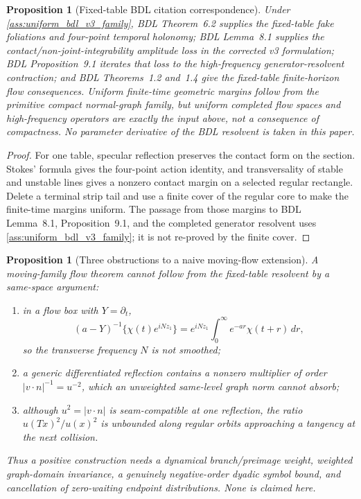 \documentclass[11pt]{amsart}
\theoremstyle{compactplain}
\newtheorem{proposition}[theorem]{Proposition}
\theoremstyle{compactdefinition}
\theoremstyle{compactremark}
\begin{document}
\begin{proposition}[Fixed-table BDL citation correspondence]
\label{prop:fixed_table_bdl_correspondence}
\label{lem:fixed_table_hopf_uni}
\label{lem:central_standard_family_compactness}
\label{lem:uniform_bdl_hypothesis_verification}
\label{prop:uniform_dolgopyat_nonintegrability}
\label{prop:imported_bdl_high_frequency}
Under \cref{ass:uniform_bdl_v3_family}, BDL Theorem~6.2 supplies the
fixed-table fake foliations and four-point temporal holonomy; BDL Lemma~8.1
supplies the contact/non-joint-integrability amplitude loss in the corrected
v3 formulation; BDL Proposition~9.1 iterates that loss to the
high-frequency generator-resolvent contraction; and BDL Theorems~1.2 and~1.4
give the fixed-table finite-horizon flow consequences.  Uniform finite-time
geometric margins follow from the primitive compact normal-graph family, but
uniform completed flow spaces and high-frequency operators are exactly the
input above, not a consequence of compactness.  No parameter derivative of
the BDL resolvent is taken in this paper.
\end{proposition}

\begin{proof}
For one table, specular reflection preserves the contact form on the section.
Stokes' formula gives the four-point action identity, and transversality of
stable and unstable lines gives a nonzero contact margin on a selected regular
rectangle.  Delete a terminal strip tail and use a finite cover of the regular
core to make the finite-time margins uniform.  The passage from those margins
to BDL Lemma~8.1, Proposition~9.1, and the completed generator resolvent uses
\cref{ass:uniform_bdl_v3_family}; it is not re-proved by the finite cover.
\end{proof}

\begin{proposition}[Three obstructions to a naive moving-flow extension]
\label{prop:flow_obstruction_trichotomy}
A moving-family flow theorem cannot follow from the fixed-table resolvent by a
same-space argument:
\begin{enumerate}[label=\textup{(\roman*)},wide,labelindent=0pt]
\item in a flow box with \(Y=\partial_t\),
\[
 (a-Y)^{-1}\{\chi(t)e^{iNz_1}\}
 =e^{iNz_1}\int_0^\infty e^{-ar}\chi(t+r)\,dr,
\]
so the transverse frequency \(N\) is not smoothed;
\item a generic differentiated reflection contains a nonzero multiplier of
order \(|v\cdot n|^{-1}=u^{-2}\), which an unweighted same-level graph norm
cannot absorb;
\item although \(u^2=|v\cdot n|\) is seam-compatible at one reflection, the
ratio \(u(Tx)^2/u(x)^2\) is unbounded along regular orbits approaching a
tangency at the next collision.
\end{enumerate}
Thus a positive construction needs a dynamical branch/preimage weight,
weighted graph-domain invariance, a genuinely negative-order dyadic symbol
bound, and cancellation of zero-waiting endpoint distributions.  None is
claimed here.
\end{proposition}
\end{document}
